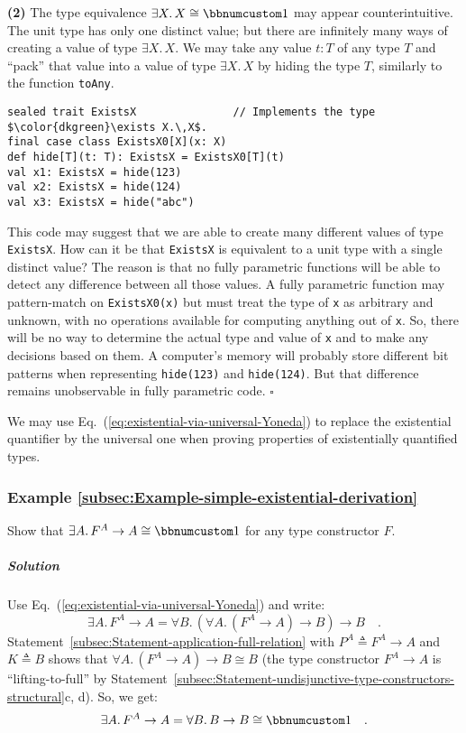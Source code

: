 \textbf{(2)} The type equivalence $\exists X.\,X\cong\bbnum 1$ may
appear counterintuitive. The unit type has only one distinct value;
but there are infinitely many ways of creating a value of type $\exists X.\,X$.
We may take any value $t:T$ of any type $T$ and \textsf{``}pack\textsf{''} that
value into a value of type $\exists X.\,X$ by hiding the type $T$,
similarly to the function \lstinline!toAny!.
\begin{lstlisting}[mathescape=true]
sealed trait ExistsX               // Implements the type $\color{dkgreen}\exists X.\,X$.
final case class ExistsX0[X](x: X)
def hide[T](t: T): ExistsX = ExistsX0[T](t)
val x1: ExistsX = hide(123)
val x2: ExistsX = hide(124)
val x3: ExistsX = hide("abc")
\end{lstlisting}
This code may suggest that we are able to create many different values
of type \lstinline!ExistsX!. How can it be that \lstinline!ExistsX!
is equivalent to a unit type with a single distinct value? The reason
is that no fully parametric functions will be able to detect any difference
between all those values. A fully parametric function may pattern-match
on \lstinline!ExistsX0(x)! but must treat the type of \lstinline!x!
as arbitrary and unknown, with no operations available for computing
anything out of \lstinline!x!. So, there will be no way to determine
the actual type and value of \lstinline!x! and to make any decisions
based on them. A computer\textsf{'}s memory will probably store different bit
patterns when representing \lstinline!hide(123)! and \lstinline!hide(124)!.
But that difference remains unobservable in fully parametric code.
$\square$

We may use Eq.~(\ref{eq:existential-via-universal-Yoneda}) to replace
the existential quantifier by the universal one when proving properties
of existentially quantified types.

\subsubsection{Example \label{subsec:Example-simple-existential-derivation}\ref{subsec:Example-simple-existential-derivation}}

Show that $\exists A.\,F^{A}\rightarrow A\cong\bbnum 1$ for any type
constructor $F$.

\subparagraph{Solution}

Use Eq.~(\ref{eq:existential-via-universal-Yoneda}) and write:
\[
\exists A.\,F^{A}\rightarrow A=\forall B.\,(\forall A.\,(F^{A}\rightarrow A)\rightarrow B)\rightarrow B\quad.
\]
Statement~\ref{subsec:Statement-application-full-relation} with
$P^{A}\triangleq F^{A}\rightarrow A$ and $K\triangleq B$ shows that
$\forall A.\,(F^{A}\rightarrow A)\rightarrow B\cong B$ (the type
constructor $F^{A}\rightarrow A$ is \textsf{``}lifting-to-full\textsf{''} by Statement~\ref{subsec:Statement-undisjunctive-type-constructors-structural}c,
d). So, we get:
\[
\exists A.\,F^{A}\rightarrow A=\forall B.\,B\rightarrow B\cong\bbnum 1\quad.
\]


